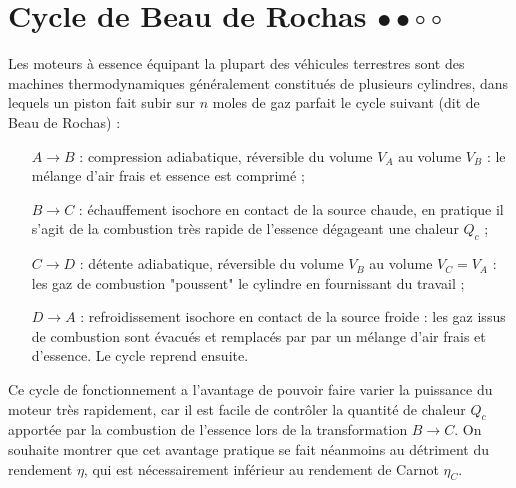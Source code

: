 \newpage

\section{Cycle de Beau de Rochas $\bullet\bullet\circ\circ$}

Les moteurs à essence équipant la plupart des véhicules terrestres sont des machines thermodynamiques généralement constitués de plusieurs cylindres, dans lequels un piston fait subir sur $n$ moles de gaz parfait le cycle suivant (dit de Beau de Rochas) :

\begin{itemize}

\item[$A \rightarrow B$ :] compression adiabatique, réversible du volume $V_A$ au volume $V_B$ : le mélange d'air frais et essence est comprimé ;
\item[$B \rightarrow C$ :] échauffement isochore en contact de la source chaude, en pratique il s'agit de la combustion très rapide de l'essence dégageant une chaleur $Q_c$ ;
\item[$C \rightarrow D$ :] détente adiabatique, réversible du volume $V_B$ au volume $V_C=V_A$ : les gaz de combustion "poussent" le cylindre en fournissant du travail ;
\item[$D \rightarrow A$ :] refroidissement isochore en contact de la source froide : les gaz issus de combustion sont évacués et remplacés par par un mélange d'air frais et d'essence. Le cycle reprend ensuite.

\end{itemize}

Ce cycle de fonctionnement a l'avantage de pouvoir faire varier la puissance du moteur très rapidement, car il est facile de contrôler la quantité de chaleur $Q_c$ apportée par la combustion de l'essence lors de la transformation $B \rightarrow C$. On souhaite montrer que cet avantage pratique se fait néanmoins au détriment du rendement $\eta$, qui est nécessairement inférieur au rendement de Carnot $\eta_C$.

